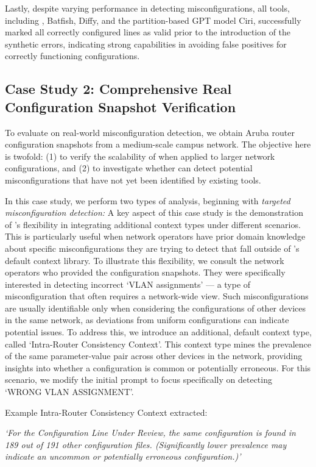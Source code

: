 Lastly, despite varying performance in detecting misconfigurations, all tools, including \sysname{}, Batfish, Diffy, and the partition-based GPT model Ciri, successfully marked all correctly configured lines as valid prior to the introduction of the synthetic errors, indicating strong capabilities in avoiding false positives for correctly functioning configurations. 

\subsection{Case Study 2: Comprehensive Real Configuration Snapshot Verification}
To evaluate \sysname{} on real-world misconfiguration detection, we obtain Aruba router configuration snapshots from a medium-scale campus network. The objective here is twofold: (1) to verify the scalability of \sysname{} when applied to larger network configurations, and (2) to investigate whether \sysname{} can detect potential misconfigurations that have not yet been identified by existing tools.


In this case study, we perform two types of analysis, beginning with \textit{targeted misconfiguration detection:} A key aspect of this case study is the demonstration of \sysname{}'s flexibility in integrating additional context types under different scenarios. This is particularly useful when network operators have prior domain knowledge about specific misconfigurations they are trying to detect that fall outside of \sysname{}'s default context library.
To illustrate this flexibility, we consult the network operators who provided the configuration snapshots. They were specifically interested in detecting incorrect `VLAN assignments' --- a type of misconfiguration that often requires a network-wide view. Such misconfigurations are usually identifiable only when considering the configurations of other devices in the same network, as deviations from uniform configurations can indicate potential issues.
To address this, we introduce an additional, default context type, called `Intra-Router Consistency Context'.  This context type mines  the prevalence of the same parameter-value pair across other devices in the network, providing insights into whether a configuration is common or potentially erroneous. For this scenario, we modify the initial prompt to focus specifically on detecting `WRONG VLAN ASSIGNMENT'.

Example Intra-Router Consistency Context extracted:

\textit{`For the Configuration Line Under Review, the same configuration is found in 189 out of 191 other configuration files. (Significantly lower prevalence may indicate an uncommon or potentially erroneous configuration.)'}

